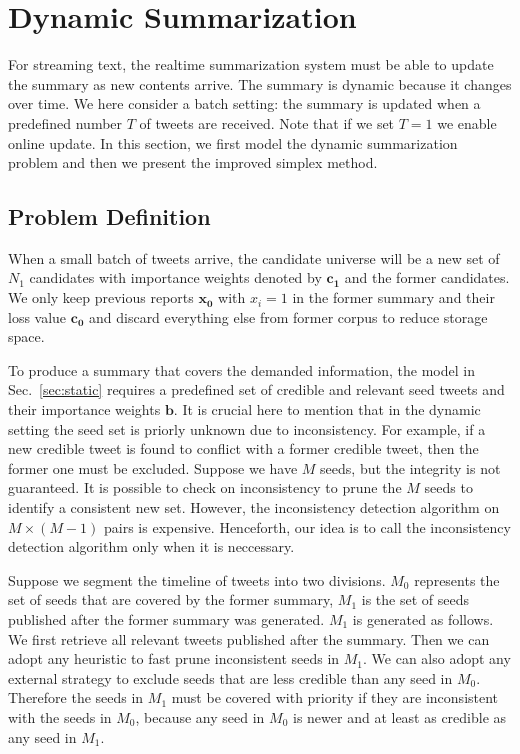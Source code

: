 \documentclass{llncs}
\begin{document}
\section{Dynamic Summarization}\label{sec:dynamic}
For streaming text, the realtime summarization system must be able to update the summary as new contents arrive. The summary is dynamic because it changes over time. We here consider a batch setting: the summary is updated when a predefined number $T$ of tweets are received. Note that if we set $T=1$ we enable online update.  In this section, we first model the dynamic summarization problem and then we present the improved simplex method.

\subsection{Problem Definition}
When a small batch of tweets arrive, the candidate universe will be a new set of $N_1 $ candidates with importance weights denoted by $\mathbf{c_1}$ and the former candidates. We only keep previous reports $\mathbf{x_0}$ with $x_i=1$ in the former summary and their loss value $\mathbf{c_0}$  and discard everything else from former corpus to reduce storage space.

To produce a summary that covers the demanded information, the model in Sec.~\ref{sec:static} requires a predefined set of credible and relevant seed tweets and their importance weights $\mathbf{b}$. It is crucial here to mention that in the dynamic setting the seed set is priorly unknown due to inconsistency. For example, if a new credible tweet is found to conflict with a former credible tweet, then the former one must be excluded. Suppose we have $M$ seeds, but the integrity is not guaranteed. It is possible to check on inconsistency to prune the $M$ seeds to identify a consistent new set. However, the inconsistency detection algorithm on $M\times (M-1)$ pairs is expensive. Henceforth, our idea is to call the inconsistency detection algorithm only when it is neccessary. 

Suppose we segment the timeline of tweets into two divisions. $M_0$ represents the set of seeds that are covered by the former summary, $M_1$ is the set of seeds published after the former summary was generated. $M_1$ is generated as follows. We first retrieve all relevant tweets published after the summary. Then we can adopt any heuristic to fast prune inconsistent seeds in $M_1$. We can also adopt any external strategy to exclude seeds that are less credible than any seed in $M_0$. Therefore the seeds in $M_1$ must be covered with priority if they are inconsistent with the seeds in $M_0$, because any seed in  $M_0$ is newer and at least as credible as any seed in $M_1$.
\end{document}
